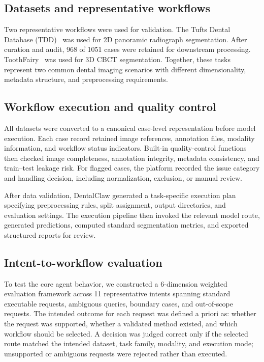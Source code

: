 \documentclass[final,5p,times,twocolumn]{elsarticle}
\begin{document}
\subsection{Datasets and representative workflows}
Two representative workflows were used for validation. The Tufts Dental Database (TDD)~\cite{panetta2022tufts} was used for 2D panoramic radiograph segmentation. After curation and audit, 968 of 1051 cases were retained for downstream processing. ToothFairy~\cite{ToothFairyDataset1,ToothFairyDataset2,ToothFairyDataset3} was used for 3D CBCT segmentation. Together, these tasks represent two common dental imaging scenarios with different dimensionality, metadata structure, and preprocessing requirements.

\subsection{Workflow execution and quality control}
All datasets were converted to a canonical case-level representation before model execution. Each case record retained image references, annotation files, modality information, and workflow status indicators. Built-in quality-control functions then checked image completeness, annotation integrity, metadata consistency, and train--test leakage risk. For flagged cases, the platform recorded the issue category and handling decision, including normalization, exclusion, or manual review.

After data validation, DentalClaw generated a task-specific execution plan specifying preprocessing rules, split assignment, output directories, and evaluation settings. The execution pipeline then invoked the relevant model route, generated predictions, computed standard segmentation metrics, and exported structured reports for review.

\subsection{Intent-to-workflow evaluation}
To test the core agent behavior, we constructed a 6-dimension weighted evaluation framework across 11 representative intents spanning standard executable requests, ambiguous queries, boundary cases, and out-of-scope requests. The intended outcome for each request was defined a priori as: whether the request was supported, whether a validated method existed, and which workflow should be selected. A decision was judged correct only if the selected route matched the intended dataset, task family, modality, and execution mode; unsupported or ambiguous requests were rejected rather than executed.
\end{document}
